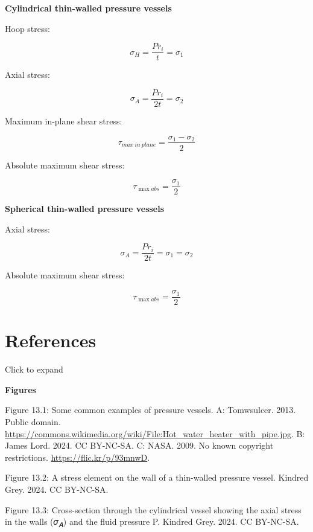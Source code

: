 \documentclass[
  letterpaper,
  DIV=11,
  numbers=noendperiod]{scrreprt}
\theoremstyle{definition}
\theoremstyle{remark}
\begin{document}
\begin{tcolorbox}[enhanced jigsaw, leftrule=.75mm, bottomrule=.15mm, opacityback=0, opacitybacktitle=0.6, colframe=quarto-callout-note-color-frame, toprule=.15mm, colbacktitle=quarto-callout-note-color!10!white, coltitle=black, bottomtitle=1mm, title={Key equations}, titlerule=0mm, toptitle=1mm, colback=white, rightrule=.15mm, left=2mm, arc=.35mm, breakable]

\textbf{Cylindrical thin-walled pressure vessels}

Hoop stress:

\[
\sigma_H=\frac{P r_i}{t}=\sigma_1
\]

Axial stress:

\[
\sigma_A=\frac{P r_i}{2 t}=\sigma_2
\]

Maximum in-plane shear stress:

\[
\tau_{max~in~plane}=\frac{\sigma_1-\sigma_2}{2}
\]

Absolute maximum shear stress:

\[
\tau_{\max a b s}=\frac{\sigma_1}{2}
\]

\textbf{Spherical thin-walled pressure vessels}

Axial stress:

\[
\sigma_A=\frac{P r_i}{2 t}=\sigma_1=\sigma_2
\]

Absolute maximum shear stress:

\[
\tau_{\max a b s}=\frac{\sigma_1}{2}
\]

\end{tcolorbox}

\section*{References}\label{references-12}


Click to expand

\textbf{Figures}

Figure 13.1: Some common examples of pressure vessels. A: Tomwsulcer.
2013. Public domain.
\url{https://commons.wikimedia.org/wiki/File:Hot_water_heater_with_pipe.jpg}.
B: James Lord. 2024. CC BY-NC-SA. C: NASA. 2009. No known copyright
restrictions. \url{https://flic.kr/p/93mnwD}.

Figure 13.2: A stress element on the wall of a thin-walled pressure
vessel. Kindred Grey. 2024. CC BY-NC-SA.

Figure 13.3: Cross-section through the cylindrical vessel showing the
axial stress in the walls (𝜎\textsubscript{𝐴}) and the fluid pressure P.
Kindred Grey. 2024. CC BY-NC-SA.
\end{document}
